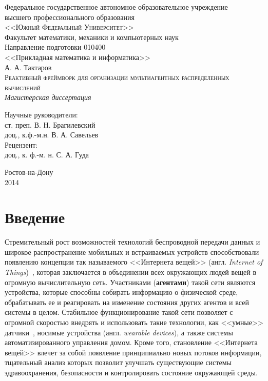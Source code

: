 \documentclass[a4paper,14pt,href,draft]{article}
\begin{document}
\thispagestyle{empty}
\begin{center}
Федеральное государственное автономное образовательное учреждение \\
высшего профессионального образования \\
\textsc{<<Южный Федеральный Университет>>}\\[1.0cm]

Факультет математики, механики и компьютерных наук\\[1.0cm]

Направление подготовки 010400 \\
<<Прикладная математика и информатика>>\\[3cm]

А. А. Тактаров \\[1.0cm]
\textsc{Реактивный фреймворк для организации мультиагентных распределенных вычислений}\\[1.0cm]

\textit{Магистерская диссертация}\\[2.0cm]

\begin{flushright}
    Научные руководители: \\
    ст. преп. В. Н. Брагилевский \\
    доц., к.ф.-м.н. В. А. Савельев \\[1.0cm]

    Рецензент: \\
    доц., к. ф.-м. н. С. А. Гуда
\end{flushright}

\vfill

  Ростов-на-Дону\\
  2014
\end{center}

\newpage
\tableofcontents

\newpage
\section*{Введение}

Стремительный рост возможностей технологий беспроводной передачи данных и широкое распространение мобильных и
встраиваемых устройств способствовали появлению концепции так называемого <<Интернета вещей>>
(англ. \textit{Internet of Things})~\cite{IoTWired}, которая заключается в объединении всех окружающих людей вещей в
огромную вычислительную сеть. Участниками (\textbf{агентами}) такой сети являются устройства, которые способны собирать
информацию о физической среде, обрабатывать ее и реагировать на изменение состояния других агентов и всей системы в целом.
Стабильное функционирование такой сети позволяет с огромной скоростью внедрять и использовать такие технологии, как
<<умные>> датчики~\cite{NestThermostat}, носимые устройства (англ. \textit{wearable devices}), а также системы
автоматизированного управления домом. Кроме того, становление <<Интернета вещей>> влечет за собой появление
принципиально новых потоков информации, тщательный анализ которых позволит улучшать существующие системы
здравоохранения, безопасности и контролировать состояние окружающей среды.
\end{document}

